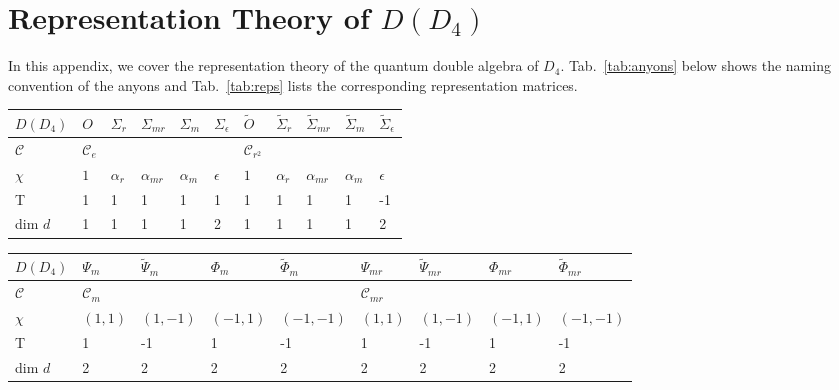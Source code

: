 \documentclass[two column]{article}
\begin{document}
\section{Representation Theory of $D(D_4)$}\label{app:reps}

In this appendix, we cover the representation theory of the quantum double algebra of $D_4$. Tab.~\ref{tab:anyons} below shows the naming convention of the anyons and Tab.~\ref{tab:reps} lists the corresponding representation matrices. 


\begin{table}
\centering
\begin{subtable}{\textwidth}
\raggedright
\begin{tabular}{l||lllll|lllll}

$D(D_4)$  & $O$     & $\Sigma_{r}$ & $\Sigma_{mr}$ & $\Sigma_{m}$ & $\Sigma_{\epsilon}$ & $\tilde{O}$ & $\tilde{\Sigma}_{r}$ & $\tilde{\Sigma}_{mr}$ & $\tilde{\Sigma}_{m}$ & $\tilde{\Sigma}_{\epsilon}$ 
\\ \hline
$\mathcal C$    & $\mathcal C_e$ &       &       &       &              &   $\mathcal C_{r^2}$     &           &       &           &                \\ $\chi$ & $1$ & $\alpha_{r}$ & $\alpha_{mr}$ & $\alpha_{m}$ & $\epsilon$          & $1$     & $\alpha_{r}$         & $\alpha_{mr}$         & $\alpha_{m}$         & $\epsilon$                  \\ 
\hline 
T & 1 & 1 & 1 & 1 & 1 & 1 & 1 & 1 & 1 & -1\\
dim $d$ & 1 & 1 & 1 & 1 & 2 & 1 & 1 & 1 & 1& 2
\end{tabular}
\end{subtable}

\vspace{0.5cm}
\medskip
\begin{subtable}{\textwidth}
\begin{tabular}{l||llll|llll}
$D(D_4)$  & $\Psi_{m}$ & $\tilde{\Psi}_{m}$ & $\Phi_{m}$ & $\tilde{\Phi}_{m}$ & $\Psi_{mr}$ & $\tilde{\Psi}_{mr}$ & $\Phi_{mr}$ & $\tilde{\Phi}_{mr}$ \\ \hline
$\mathcal C$    & $\mathcal C_m$    &          &    &            & $\mathcal C_{mr}$    &           &   &           \\ %
$\chi$ & $(1,1)$    & $(1,-1)$              & $(-1,1)$    & $(-1,-1)$              &$(1,1)$    & $(1,-1)$              & $(-1,1)$    & $(-1,-1)$             \\ \hline
T  & 1 & -1 & 1 & -1 & 1 & -1 & 1 & -1 \\
dim $d$ & 2 & 2 & 2 & 2 & 2 & 2 & 2 & 2 
\end{tabular}
\end{subtable}
\medskip


\end{table}
\end{document}

